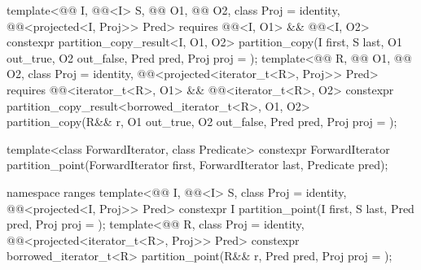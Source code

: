 \begin{codeblock}
{{    template<@@ I, @@<I> S,
             @@ O1, @@ O2,
             class Proj = identity, @@<projected<I, Proj>> Pred>
      requires @@<I, O1> && @@<I, O2>
      constexpr partition_copy_result<I, O1, O2>
        partition_copy(I first, S last, O1 out_true, O2 out_false, Pred pred,
                       Proj proj = {});
    template<@@ R, @@ O1, @@ O2,
             class Proj = identity,
             @@<projected<iterator_t<R>, Proj>> Pred>
      requires @@<iterator_t<R>, O1> &&
               @@<iterator_t<R>, O2>
      constexpr partition_copy_result<borrowed_iterator_t<R>, O1, O2>
        partition_copy(R&& r, O1 out_true, O2 out_false, Pred pred, Proj proj = {});
  }

  template<class ForwardIterator, class Predicate>
    constexpr ForwardIterator
      partition_point(ForwardIterator first, ForwardIterator last,
                      Predicate pred);

  namespace ranges {
    template<@@ I, @@<I> S, class Proj = identity,
             @@<projected<I, Proj>> Pred>
      constexpr I partition_point(I first, S last, Pred pred, Proj proj = {});
    template<@@ R, class Proj = identity,
             @@<projected<iterator_t<R>, Proj>> Pred>
      constexpr borrowed_iterator_t<R>
        partition_point(R&& r, Pred pred, Proj proj = {});
  }

}
\end{codeblock}
